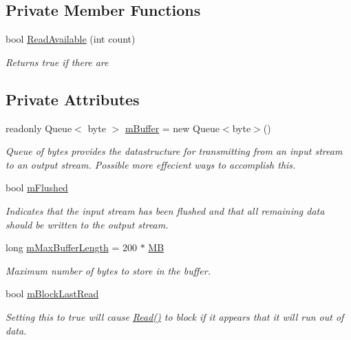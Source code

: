 \subsection*{Private Member Functions}
\begin{DoxyCompactItemize}
\item 
bool \mbox{\hyperlink{class_a_d_l_1_1_pipe_stream_a82add2a351991d0f3580d4a198f44675}{Read\+Available}} (int count)
\begin{DoxyCompactList}\small\item\em Returns true if there are \end{DoxyCompactList}\end{DoxyCompactItemize}
\subsection*{Private Attributes}
\begin{DoxyCompactItemize}
\item 
readonly Queue$<$ byte $>$ \mbox{\hyperlink{class_a_d_l_1_1_pipe_stream_ac3ea3e53b1c4a1344a6a9618a67751df}{m\+Buffer}} = new Queue$<$byte$>$()
\begin{DoxyCompactList}\small\item\em Queue of bytes provides the datastructure for transmitting from an input stream to an output stream. Possible more effecient ways to accomplish this. \end{DoxyCompactList}\item 
bool \mbox{\hyperlink{class_a_d_l_1_1_pipe_stream_a186ff66fbf297d1491d7ca528326c3da}{m\+Flushed}}
\begin{DoxyCompactList}\small\item\em Indicates that the input stream has been flushed and that all remaining data should be written to the output stream. \end{DoxyCompactList}\item 
long \mbox{\hyperlink{class_a_d_l_1_1_pipe_stream_af8cc7772cf7ae02b1890ab8c58d0cbad}{m\+Max\+Buffer\+Length}} = 200 $\ast$ \mbox{\hyperlink{class_a_d_l_1_1_pipe_stream_ad4a04360b3d017567a0fd48defd434d0}{MB}}
\begin{DoxyCompactList}\small\item\em Maximum number of bytes to store in the buffer. \end{DoxyCompactList}\item 
bool \mbox{\hyperlink{class_a_d_l_1_1_pipe_stream_a1dd964eae6da39ffb26d8bb1ff8ffaa7}{m\+Block\+Last\+Read}}
\begin{DoxyCompactList}\small\item\em Setting this to true will cause \mbox{\hyperlink{class_a_d_l_1_1_pipe_stream_ada829c0b71d6896e2bb3cd5d37ccba34}{Read()}} to block if it appears that it will run out of data. \end{DoxyCompactList}\end{DoxyCompactItemize}


